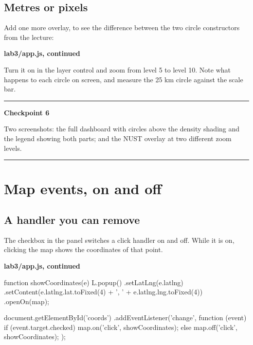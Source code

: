\documentclass{article}
\newcommand{\codecap}[1]{%
  \par\vspace{.9em}\noindent\textbf{#1}\par\vspace{-.6em}}
\newenvironment{keypoint}[1]
  {\par\vspace{.7em}\noindent\rule{\linewidth}{.6pt}\par\vspace{.15em}
   \noindent\textbf{#1}\par\nobreak\vspace{-.3em}}
  {\par\vspace{.15em}\noindent\rule{\linewidth}{.6pt}\par\vspace{.7em}}
\begin{document}
\subsection{Metres or pixels}

Add one more overlay, to see the difference between the two circle
constructors from the lecture:

\codecap{lab3/app.js, continued}

Turn it on in the layer control and zoom from level 5 to level 10. Note
what happens to each circle on screen, and measure the 25 km circle
against the scale bar.

\begin{keypoint}{Checkpoint 6}
Two screenshots: the full dashboard with circles above the density
shading and the legend showing both parts; and the NUST overlay at two
different zoom levels.
\end{keypoint}


\section{Map events, on and off}

\subsection{A handler you can remove}

The checkbox in the panel switches a click handler on and off. While it
is on, clicking the map shows the coordinates of that point.

\codecap{lab3/app.js, continued}
\begin{code}
function showCoordinates(e) {
  L.popup()
    .setLatLng(e.latlng)
    .setContent(e.latlng.lat.toFixed(4) + ', ' + e.latlng.lng.toFixed(4))
    .openOn(map);
}

document.getElementById('coords')
  .addEventListener('change', function (event) {
    if (event.target.checked) {
      map.on('click', showCoordinates);
    } else {
      map.off('click', showCoordinates);
    }
  });
\end{code}
\end{document}
